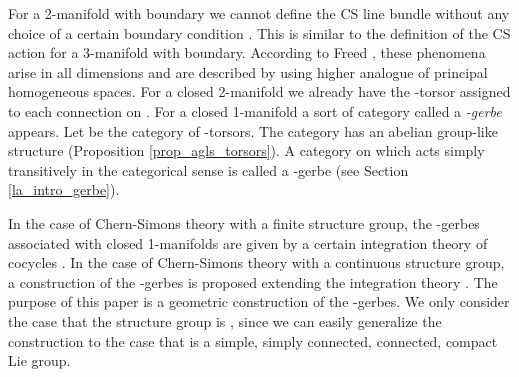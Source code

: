 \documentclass[a4paper,a4paper]{article}
\theoremstyle{definition}
\theoremstyle{remark}
\providecommand{\T}{\mathbb{T}}
\providecommand{\sT}{\mathcal{T}}
\begin{document}
For a 2-manifold with boundary we cannot define the CS line bundle without any choice of a certain boundary condition \cite{F1}. This is similar to the definition of the CS action for a 3-manifold with boundary. According to Freed \cite{F2}, these phenomena arise in all dimensions and are described by using higher analogue of principal homogeneous spaces. For a closed 2-manifold we already have the \myHighlight{$\T$}\coordHE{}-torsor \coordHE{} assigned to each connection on \coordHE{}. For a closed 1-manifold a sort of category called a \textit{\myHighlight{$\T$}\coordHE{}-gerbe} \cite{F2} appears. Let \myHighlight{$\sT$}\coordHE{} be the category of \myHighlight{$\T$}\coordHE{}-torsors. The category has an abelian group-like structure (Proposition \ref{prop_agls_torsors}). A category on which \myHighlight{$\sT$}\coordHE{} acts simply transitively in the categorical sense is called a \myHighlight{$\T$}\coordHE{}-gerbe (see Section \ref{la_intro_gerbe}). 

In the case of Chern-Simons theory with a finite structure group, the \myHighlight{$\T$}\coordHE{}-gerbes associated with closed 1-manifolds are given by a certain integration theory of cocycles \cite{F2}. In the case of Chern-Simons theory with a continuous structure group, a construction of the \myHighlight{$\T$}\coordHE{}-gerbes is proposed extending the integration theory \cite{F3, F4}. The purpose of this paper is a geometric construction of the \myHighlight{$\T$}\coordHE{}-gerbes. We only consider the case that the structure group \coordHE{} is \coordHE{}, since we can easily generalize the construction to the case that \coordHE{} is a simple, simply connected, connected, compact Lie group.
\end{document}
